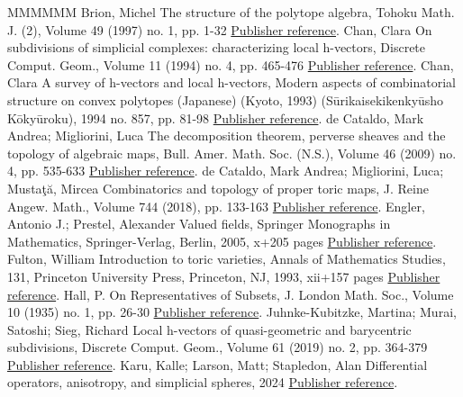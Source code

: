 \documentclass[11pt]{article}
\theoremstyle{definition}
\numberwithin{equation}{section}
\numberwithin{equation}{section}
\begin{document}
\begin{thebibliography}{MMMMMM}
 Brion, Michel The structure of the polytope algebra, Tohoku Math. J. (2), Volume 49 (1997) no. 1, pp. 1-32 \href{https://alco.centre-mersenne.org/articles/10.5802/alco.453/#BrionStructurePolytopeAlgebra}{Publisher reference}.
 Chan, Clara On subdivisions of simplicial complexes: characterizing local h-vectors, Discrete Comput. Geom., Volume 11 (1994) no. 4, pp. 465-476 \href{https://alco.centre-mersenne.org/articles/10.5802/alco.453/#ChanLocal}{Publisher reference}.
 Chan, Clara A survey of h-vectors and local h-vectors, Modern aspects of combinatorial structure on convex polytopes (Japanese) (Kyoto, 1993) (Sūrikaisekikenkyūsho Kōkyūroku), 1994 no. 857, pp. 81-98 \href{https://alco.centre-mersenne.org/articles/10.5802/alco.453/#ChanSurvey}{Publisher reference}.
 de Cataldo, Mark Andrea; Migliorini, Luca The decomposition theorem, perverse sheaves and the topology of algebraic maps, Bull. Amer. Math. Soc. (N.S.), Volume 46 (2009) no. 4, pp. 535-633 \href{https://alco.centre-mersenne.org/articles/10.5802/alco.453/#dCM}{Publisher reference}.
 de Cataldo, Mark Andrea; Migliorini, Luca; Mustaţă, Mircea Combinatorics and topology of proper toric maps, J. Reine Angew. Math., Volume 744 (2018), pp. 133-163 \href{https://alco.centre-mersenne.org/articles/10.5802/alco.453/#deCataldoMiglioriniMustata18}{Publisher reference}.
 Engler, Antonio J.; Prestel, Alexander Valued fields, Springer Monographs in Mathematics, Springer-Verlag, Berlin, 2005, x+205 pages \href{https://alco.centre-mersenne.org/articles/10.5802/alco.453/#EPValuedFields}{Publisher reference}.
 Fulton, William Introduction to toric varieties, Annals of Mathematics Studies, 131, Princeton University Press, Princeton, NJ, 1993, xii+157 pages \href{https://alco.centre-mersenne.org/articles/10.5802/alco.453/#Fulton}{Publisher reference}.
 Hall, P. On Representatives of Subsets, J. London Math. Soc., Volume 10 (1935) no. 1, pp. 26-30 \href{https://alco.centre-mersenne.org/articles/10.5802/alco.453/#HallRepresentativesSubsets}{Publisher reference}.
 Juhnke-Kubitzke, Martina; Murai, Satoshi; Sieg, Richard Local h-vectors of quasi-geometric and barycentric subdivisions, Discrete Comput. Geom., Volume 61 (2019) no. 2, pp. 364-379 \href{https://alco.centre-mersenne.org/articles/10.5802/alco.453/#JKSS}{Publisher reference}.
 Karu, Kalle; Larson, Matt; Stapledon, Alan Differential operators, anisotropy, and simplicial spheres, 2024 \href{https://alco.centre-mersenne.org/articles/10.5802/alco.453/#KLS}{Publisher reference}.

\end{thebibliography}
\end{document}

